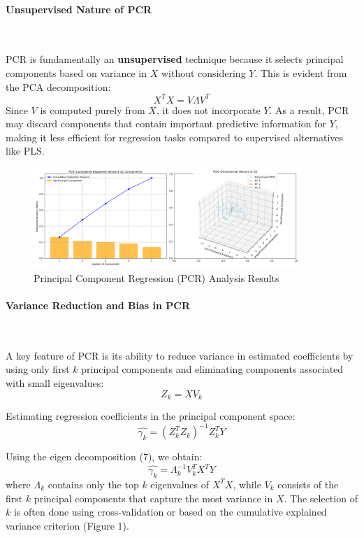 \documentclass[11pt,twoside,a4paper]{article}
\begin{document}
 \paragraph{Unsupervised Nature of PCR} \ \

PCR is fundamentally an \textbf{unsupervised} technique because it selects principal components based on variance in \( X \) without considering \( Y \). This is evident from the PCA decomposition:
\begin{equation}
X^T X = V \Lambda V^T
\end{equation}
Since \( V \) is computed purely from \( X \), it does not incorporate \( Y \). As a result, PCR may discard components that contain important predictive information for \( Y \), making it less efficient for regression tasks compared to supervised alternatives like PLS.

\begin{figure}[H]
    \centering
    \includegraphics[width=0.9\textwidth]{PCR_Selected_Analysis.png}
    \caption{Principal Component Regression (PCR) Analysis Results}
    \label{fig:PCR_analysis}
\end{figure}

\newpage
\paragraph{Variance Reduction and Bias in PCR}  \ \

A key feature of PCR is its ability to reduce variance in estimated coefficients by using only first \( k \) principal components and eliminating components associated with small eigenvalues:
   \begin{equation}
    Z_k = X V_k
    \end{equation}
    
Estimating regression coefficients in the principal component space:    
    \begin{equation}
\hat{\gamma_k} = (Z_k^T Z_k)^{-1} Z_k^T Y
\end{equation}

Using the eigen decomposition (7), we obtain:
\begin{equation}
\hat{\gamma_k}  = \Lambda_k^{-1} V_k^T X^T Y
\end{equation}
    where \( \Lambda_k \) contains only the top \( k \) eigenvalues of \( X^T X \), while \( V_k \) consists of the first \( k \) principal components that capture the most variance in \( X \). The selection of \( k \) is often done using cross-validation or based on the cumulative explained variance criterion (Figure 1).
\end{document}
